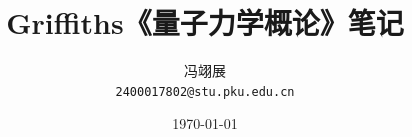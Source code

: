 \title{\textbf{Griffiths《量子力学概论》笔记}}
\author{冯翊展 \\ 
    \normalsize{\texttt{2400017802@stu.pku.edu.cn}}}
\date{\today}